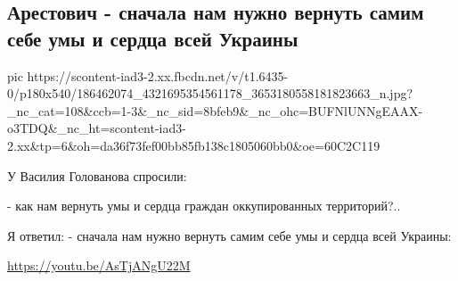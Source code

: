  
 
 
 
 
\subsection{Арестович - сначала нам нужно вернуть самим себе умы и сердца всей Украины}
\label{sec:13_05_2021.fb.arestovich_aleksej.1.primirenie_ukraina_donbass}

\ifcmt
  pic https://scontent-iad3-2.xx.fbcdn.net/v/t1.6435-0/p180x540/186462074_4321695354561178_3653180558181823663_n.jpg?_nc_cat=108&ccb=1-3&_nc_sid=8bfeb9&_nc_ohc=BUFNlUNNgEAAX-o3TDQ&_nc_ht=scontent-iad3-2.xx&tp=6&oh=da36f73fef00bb85fb138c1805060bb0&oe=60C2C119
\fi

У Василия Голованова спросили:

- как нам вернуть умы и сердца граждан оккупированных территорий?..

Я ответил:
- сначала нам нужно вернуть самим себе умы и сердца всей Украины: 

\url{https://youtu.be/AsTjANgU22M}
